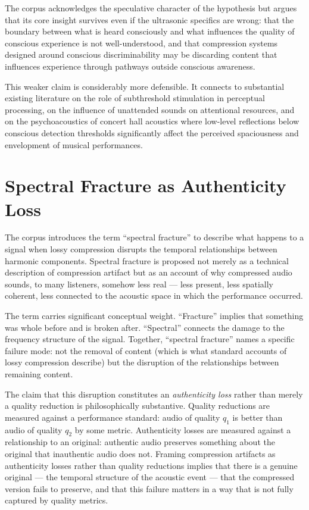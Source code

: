 The corpus acknowledges the speculative character of the
hypothesis but argues that its core insight survives even
if the ultrasonic specifics are wrong: that the boundary
between what is heard consciously and what influences the
quality of conscious experience is not well-understood, and
that compression systems designed around conscious
discriminability may be discarding content that influences
experience through pathways outside conscious awareness.

This weaker claim is considerably more defensible. It connects
to substantial existing literature on the role of subthreshold
stimulation in perceptual processing, on the influence of
unattended sounds on attentional resources, and on the
psychoacoustics of concert hall acoustics where low-level
reflections below conscious detection thresholds significantly
affect the perceived spaciousness and envelopment of musical
performances.

\section{Spectral Fracture as Authenticity Loss}
\label{sec:spectral-fracture}

The corpus introduces the term ``spectral fracture'' to describe
what happens to a signal when lossy compression disrupts the
temporal relationships between harmonic components. Spectral
fracture is proposed not merely as a technical description of
compression artifact but as an account of why compressed audio
sounds, to many listeners, somehow less real --- less present,
less spatially coherent, less connected to the acoustic space
in which the performance occurred.

The term carries significant conceptual weight. ``Fracture''
implies that something was whole before and is broken after.
``Spectral'' connects the damage to the frequency structure
of the signal. Together, ``spectral fracture'' names a
specific failure mode: not the removal of content (which is
what standard accounts of lossy compression describe) but the
disruption of the relationships between remaining content.

The claim that this disruption constitutes an \textit{authenticity
loss} rather than merely a quality reduction is philosophically
substantive. Quality reductions are measured against a performance
standard: audio of quality $q_1$ is better than audio of quality
$q_2$ by some metric. Authenticity losses are measured against
a relationship to an original: authentic audio preserves something
about the original that inauthentic audio does not. Framing
compression artifacts as authenticity losses rather than quality
reductions implies that there is a genuine original --- the
temporal structure of the acoustic event --- that the compressed
version fails to preserve, and that this failure matters in a
way that is not fully captured by quality metrics.

